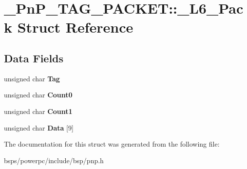 \hypertarget{struct__PnP__TAG__PACKET_1_1__L6__Pack}{}\section{\+\_\+\+Pn\+P\+\_\+\+T\+A\+G\+\_\+\+P\+A\+C\+K\+ET\+::\+\_\+\+L6\+\_\+\+Pack Struct Reference}
\label{struct__PnP__TAG__PACKET_1_1__L6__Pack}
\subsection*{Data Fields}
\begin{DoxyCompactItemize}
\item 
\mbox{\label{struct__PnP__TAG__PACKET_1_1__L6__Pack_ac478dd383aa65aaa027d4a8bbcb6d503}} 
unsigned char {\bfseries Tag}
\item 
\mbox{\label{struct__PnP__TAG__PACKET_1_1__L6__Pack_aea2af22ab3890dc6235216b606638c8d}} 
unsigned char {\bfseries Count0}
\item 
\mbox{\label{struct__PnP__TAG__PACKET_1_1__L6__Pack_a40b1f570a95b9e92e8a55c9996c68af8}} 
unsigned char {\bfseries Count1}
\item 
\mbox{\label{struct__PnP__TAG__PACKET_1_1__L6__Pack_a803b8da0d456fdeee5f55eed1314cd68}} 
unsigned char {\bfseries Data} \mbox{[}9\mbox{]}
\end{DoxyCompactItemize}


The documentation for this struct was generated from the following file\+:\begin{DoxyCompactItemize}
\item 
bsps/powerpc/include/bsp/pnp.\+h\end{DoxyCompactItemize}
